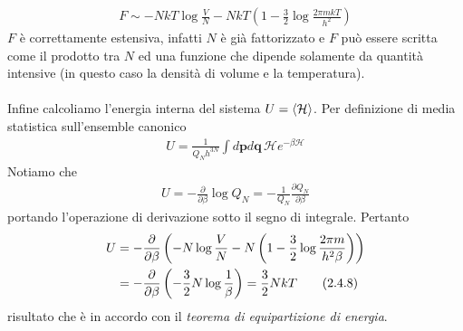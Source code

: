 \documentclass{article}
\begin{document}
\begin{align}
    F \sim -NkT\log\frac{V}{N} - NkT\left(1 - \frac{3}{2}\log\frac{2\pi mkT}{h^2}\right) \tag{2.4.5}
\end{align}
$F$ è correttamente estensiva, infatti $N$ è già fattorizzato e $F$ può essere scritta come il prodotto tra $N$ ed una funzione che dipende solamente da quantità intensive (in questo caso la densità di volume e la temperatura). \\ \\
Infine calcoliamo l'energia interna del sistema $U = \braket{\mathcal{H}}$. Per definizione di media statistica sull'ensemble canonico
\begin{align}
    U = \frac{1}{Q_Nh^{3N}}\int d\mathbf{p}d\mathbf{q} \, \mathcal{H}e^{-\beta\mathcal{H}} \tag{2.4.6}
\end{align}
Notiamo che 
\begin{align}
    U = -\frac{\partial}{\partial \beta}\log Q_N = -\frac{1}{Q_N}\frac{\partial Q_N}{\partial\beta} \tag{2.4.7}
\end{align}
portando l'operazione di derivazione sotto il segno di integrale. Pertanto 
\begin{align}
    U &= -\frac{\partial}{\partial\beta}\left(-N\log\frac{V}{N} -N\left(1 - \frac{3}{2}\log\frac{2\pi m}{h^2\beta}\right)\right) \notag \\
    &= -\frac{\partial}{\partial\beta}\left(-\frac{3}{2}N\log\frac{1}{\beta}\right) = \frac{3}{2}NkT \tag{2.4.8}
\end{align}
risultato che è in accordo con il \textit{teorema di equipartizione di energia}.

\newpage
\end{document}

